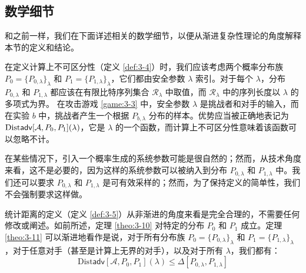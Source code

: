 \subsection{数学细节}

和之前一样，我们在下面详述相关的数学细节，以便从渐进复杂性理论的角度解释本节的定义和结论。

在定义计算上不可区分性（定义 \ref{def:3-4}）时，我们应该考虑两个概率分布族 $P_0=\{P_{0,\lambda}\}_{\lambda}$ 和 $P_1=\{P_{1,\lambda}\}_{\lambda}$，它们都由安全参数 $\lambda$ 索引。对于每个 $\lambda$，分布 $P_{0,\lambda}$ 和 $P_{1,\lambda}$ 都应该在有限比特序列集合 $\mathcal{R}_\lambda$ 中取值，而 $\mathcal{R}_\lambda$ 中的序列长度以 $\lambda$ 的多项式为界。 在攻击游戏 \ref{game:3-3} 中，安全参数 $\lambda$ 是挑战者和对手的输入，而在实验 $b$ 中，挑战者产生一个根据 $P_{b,\lambda}$ 分布的样本。优势应当被正确地表记为 ${\rm Dist\mathsf{adv}}[\mathcal{A},P_0,P_1](\lambda)$，它是 $\lambda$ 的一个函数，而计算上不可区分性意味着该函数可以忽略不计。

在某些情况下，引入一个概率生成的系统参数可能是很自然的；然而，从技术角度来看，这不是必要的，因为这样的系统参数可以被纳入到分布 $P_{0,\lambda}$ 和 $P_{1,\lambda}$ 中。我们还可以要求 $P_{0,\lambda}$ 和 $P_{1,\lambda}$ 是可有效采样的；然而，为了保持定义的简单性，我们不会强制要求这样做。

统计距离的定义（定义 \ref{def:3-5}）从非渐进的角度来看是完全合理的，不需要任何修改或阐述。如前所述，定理 \ref{theo:3-10} 对特定的分布 $P_0$ 和 $P_1$ 成立。定理 \ref{theo:3-11} 可以渐进地看作是说，对于所有分布族 $P_0=\{P_{0,\lambda}\}_{\lambda}$ 和 $P_1=\{P_{1,\lambda}\}_{\lambda}$，对于任意对手（甚至是计算上无界的对手），以及对于所有 $\lambda$，我们都有：
\[
\mathrm{Dist}\mathsf{adv}[\mathcal{A},P_0,P_1](\lambda)
\leq\Delta[P_{0,\lambda},P_{1,\lambda}]
\]